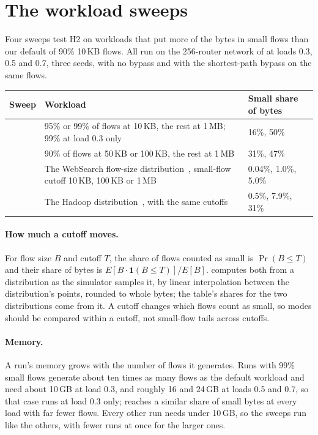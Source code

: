 \section{The workload sweeps}
\label{app:workloads}

Four sweeps test H2 on workloads that put more of the bytes in small flows than our default of 90\% 10\,KB flows. All run on the 256-router network of  at loads 0.3, 0.5 and 0.7, three seeds, with no bypass and with the shortest-path bypass on the same flows.

\begin{center}
\small
\begin{tabularx}{\linewidth}{@{}l L l@{}}
\toprule
Sweep & Workload & Small share of bytes \\
\midrule
{} & 95\% or 99\% of flows at 10\,KB, the rest at 1\,MB; 99\% at load 0.3 only & 16\%, 50\% \\
 & 90\% of flows at 50\,KB or 100\,KB, the rest at 1\,MB & 31\%, 47\% \\
 & The WebSearch flow-size distribution~\cite{dctcp}, small-flow cutoff 10\,KB, 100\,KB or 1\,MB & 0.04\%, 1.0\%, 5.0\% \\
 & The Hadoop distribution~\cite{fbdc}, with the same cutoffs & 0.5\%, 7.9\%, 31\% \\
\bottomrule
\end{tabularx}
\end{center}

\paragraph{How much a cutoff moves.} For flow size $B$ and cutoff $T$, the share of flows counted as small is $\Pr(B \le T)$ and their share of bytes is $E[B \cdot \mathbf{1}(B \le T)] / E[B]$.  computes both from a distribution as the simulator samples it, by linear interpolation between the distribution's points, rounded to whole bytes; the table's shares for the two distributions come from it. A cutoff changes which flows count as small, so modes should be compared within a cutoff, not small-flow tails across cutoffs.

\paragraph{Memory.} A run's memory grows with the number of flows it generates. Runs with 99\% small flows generate about ten times as many flows as the default workload and need about 10\,GB at load 0.3, and roughly 16 and 24\,GB at loads 0.5 and 0.7, so that case runs at load 0.3 only;  reaches a similar share of small bytes at every load with far fewer flows. Every other run needs under 10\,GB, so the sweeps run like the others, with fewer runs at once for the larger ones.

